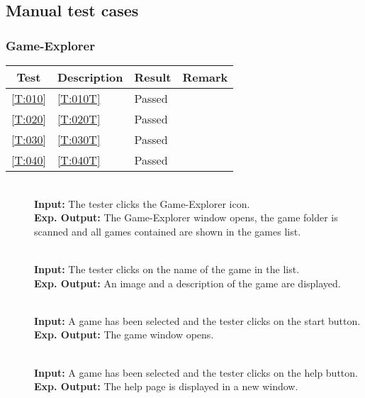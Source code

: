 \subsection{Manual test cases}

\subsubsection{Game-Explorer}

\begin{tabular}{clll}
	\hline
	\textbf{Test} & \textbf{Description} & \textbf{Result} & \textbf{Remark} \\
	\hline
	\ref{T:010} & \ref{T:010T} & Passed & \\
	\ref{T:020} & \ref{T:020T} & Passed & \\
	\ref{T:030} & \ref{T:030T} & Passed & \\
	\ref{T:040} & \ref{T:040T} & Passed & \\
	\hline
\end{tabular}

\begin{description}
	\item[] \textbf{} \\
	\textbf{Input:} The tester clicks the Game-Explorer icon. \\
	\textbf{Exp. Output:} The Game-Explorer window opens, the game folder is scanned and all games contained are shown in the games list.
	
	\item[] \textbf{} \\
	\textbf{Input:} The tester clicks on the name of the game in the list. \\
	\textbf{Exp. Output:} An image and a description of the game are displayed.
	
	\item[] \textbf{} \\
	\textbf{Input:} A game has been selected and the tester clicks on the start button. \\
	\textbf{Exp. Output:} The game window opens.
	
	\item[] \textbf{} \\
	\textbf{Input:} A game has been selected and the tester clicks on the help button. \\
	\textbf{Exp. Output:} The help page is displayed in a new window.
\end{description}

